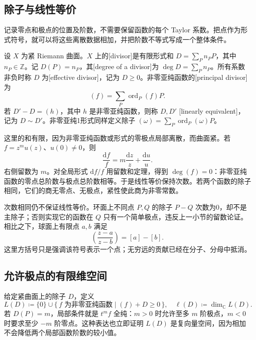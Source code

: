 \subsection{除子与线性等价}
\label{b3:subsec:A0203}

记录零点和极点的位置及阶数，不需要保留函数的每个 Taylor 系数。把点作为形式符号，就可以将这些离散数据相加，并把阶数不等式写成一个整体条件。

\begin{definition}[除子]\label{b3:def:A-divisor}
设 \(X\) 为紧 Riemann 曲面。\(X\) 上的[divisor]是有限形式和 \(D=\sum_P n_PP\)，其中 \(n_P\in\mathbb Z\)。记 \(D(P)=n_P\)，其[degree of a divisor]为 \(\deg D=\sum_P n_P\)。所有系数非负时称 \(D\) 为[effective divisor]，记为 \(D\ge0\)。非零亚纯函数的[principal divisor]为
\[
 (f)=\sum_P\operatorname{ord}_P(f)P.
\]
若 \(D'-D=(h)\)，其中 \(h\) 是非零亚纯函数，则称 \(D,D'\) [linearly equivalent]，记为 \(D\sim D'\)。非零亚纯1形式同样定义除子 \((\omega)=\sum_P\operatorname{ord}_P(\omega)P\)。
\end{definition}

这里的和有限，因为非零亚纯函数或形式的零极点局部离散，而曲面紧。若 \(f=z^m u(z)\)、\(u(0)\ne0\)，则
\[
 \frac{\mathrm{d}f}{f}=m\frac{\mathrm{d}z}{z}+\frac{\mathrm{d}u}{u}.
\]
右侧留数为 \(m\)。对全局形式 \(\mathrm{d}f/f\) 用留数和定理，得到 \(\deg(f)=0\)：非零亚纯函数的零点总阶数与极点总阶数相等。于是线性等价保持次数。若两个函数的除子相同，它们的商无零点、无极点，紧性使此商为非零常数。

\ProseParagraphBreak
次数相同仍不保证线性等价。环面上不同点 \(P,Q\) 的除子 \(P-Q\) 次数为0，却不是主除子；否则实现它的函数在 \(Q\) 只有一个简单极点，违反上一小节的留数论证。相比之下，球面上有限点 \(a,b\) 满足
\[
 \left(\frac{z-a}{z-b}\right)=[a]-[b].
\]
这里方括号只是强调该符号表示一个点；无穷远的贡献已经在分子、分母中抵消。

\subsection{允许极点的有限维空间}
\label{b3:subsec:A0204}

给定紧曲面上的除子 \(D\)，定义
\[
 L(D)\coloneqq\{0\}\cup
 \{\,f\text{ 为非零亚纯函数}\mid(f)+D\ge0\,\},
 \quad \ell(D)\coloneqq\dim_{\mathbb C}L(D).
\]
若 \(D(P)=m\)，局部条件就是 \(t^m f\) 全纯：\(m>0\) 时允许至多 \(m\) 阶极点，\(m<0\) 时要求至少 \(-m\) 阶零点。这种表达也立即证明 \(L(D)\) 是复向量空间，因为相加不会降低两个局部函数阶数的较小值。

